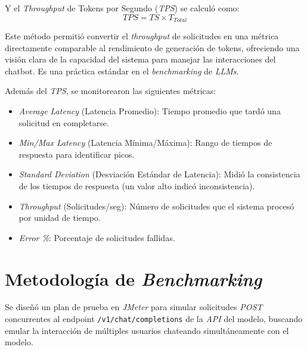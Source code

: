 Y el \textit{Throughput} de Tokens por Segundo (\textit{TPS}) se calculó como:
\begin{equation*}
TPS = TS \times T_{Total}
\end{equation*}

Este método permitió convertir el \textit{throughput} de solicitudes en una métrica directamente comparable al rendimiento de generación de tokens, ofreciendo una visión clara de la capacidad del sistema para manejar las interacciones del chatbot. Es una práctica estándar en el \textit{benchmarking} de \textit{LLMs}.

Además del \textit{TPS}, se monitorearon las siguientes métricas:
\begin{itemize}
    \item \textit{Average Latency} (Latencia Promedio): Tiempo promedio que tardó una solicitud en completarse.
    \item \textit{Min/Max Latency} (Latencia Mínima/Máxima): Rango de tiempos de respuesta para identificar picos.
    \item \textit{Standard Deviation} (Desviación Estándar de Latencia): Midió la consistencia de los tiempos de respuesta (un valor alto indicó inconsistencia).
    \item \textit{Throughput} (Solicitudes/seg): Número de solicitudes que el sistema procesó por unidad de tiempo.
    \item \textit{Error \%}: Porcentaje de solicitudes fallidas.
\end{itemize}

\section{Metodología de \textit{Benchmarking}}
Se diseñó un plan de prueba en \textit{JMeter} para simular solicitudes \textit{POST} concurrentes al endpoint \texttt{/v1/chat/completions} de la \textit{API} del modelo, buscando emular la interacción de múltiples usuarios chateando simultáneamente con el modelo.

